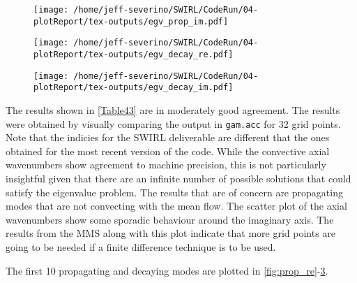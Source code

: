 \begin{figure}[h!]
    \centering
    \texttt{[image: /home/jeff-severino/SWIRL/CodeRun/04-plotReport/tex-outputs/egv\_prop\_im.pdf]}
    \label{fig:prop_im}
\end{figure}

\begin{figure}[h!]
    \centering
    \texttt{[image: /home/jeff-severino/SWIRL/CodeRun/04-plotReport/tex-outputs/egv\_decay\_re.pdf]}
    \label{fig:decay_re} 
\end{figure}

\begin{figure}[h!]
    \centering
    \texttt{[image: /home/jeff-severino/SWIRL/CodeRun/04-plotReport/tex-outputs/egv\_decay\_im.pdf]}
    \label{fig:decay_im} 
\end{figure}








The results shown in \ref{Table43} are in moderately good agreement. The 
results were obtained by visually comparing the output in \verb|gam.acc| for 32 
grid points. Note that the indicies for the SWIRL deliverable are different that 
the ones obtained for the most recent version of the code. While the 
convective axial wavenumbers show agreement to machine precision, this is not 
particularly insightful given that there are an infinite number of possible solutions 
that could satisfy the eigenvalue problem. The results that are of concern 
are propagating modes that are not convecting with the mean flow.  The scatter plot
of the axial wavenumbers show some sporadic behaviour around the imaginary axis.
The results from the MMS along with this plot indicate that more grid points are going 
to be needed if a finite difference technique is to be used.

The first 10 propagating and decaying modes are plotted in \ref{fig:prop_re}-\ref{fig:decay_im}.





